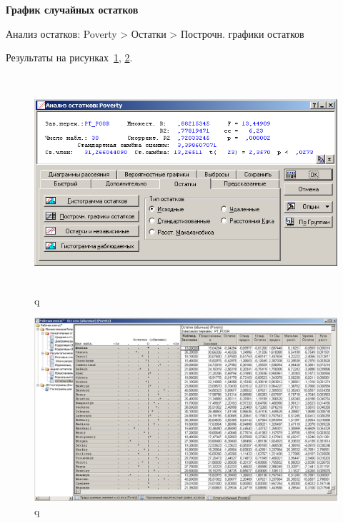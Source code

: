 \newpage

\begin{center}
  \textbf{График случайных остатков}
\end{center}

Анализ остатков: Poverty > Остатки > Построчн. графики остатков

Результаты на рисунках~\ref{fig:example_27}, \ref{fig:example_28}.

\begin{figure}[!h]
  \centering

  \includegraphics[height=8cm]
  {inc/example_27.PNG}

  \caption{q}

  \label{fig:example_27}
\end{figure}

\begin{figure}[!h]
  \centering

  \includegraphics[width=17cm]
  {inc/example_28.PNG}

  \caption{q}

  \label{fig:example_28}
\end{figure}


